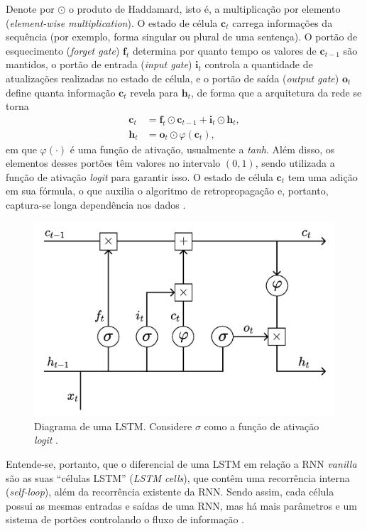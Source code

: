 \documentclass{automatextcc}
\newcommand{\bs}[1]{\boldsymbol{#1}}
\begin{document}
Denote por $\odot$ o produto de Haddamard, isto é, a multiplicação por elemento (\textit{element-wise multiplication}). O estado de célula $\bs{c}_t$ carrega informações da sequência (por exemplo, forma singular ou plural de uma sentença). O portão de esquecimento (\textit{forget gate}) $\bs{f}_t$ determina por quanto tempo os valores de $\bs{c}_{t-1}$ são mantidos, o portão de entrada (\textit{input gate}) $\bs{i}_t$ controla a quantidade de atualizações realizadas no estado de célula, e o portão de saída (\textit{output gate}) $\bs{o}_t$ define quanta informação $\bs{c}_t$ revela para $\bs{h}_t$, de forma que a arquitetura da rede se torna 
\begin{align*}
    \bs{c}_{t} & = \bs{f}_{t} \odot \bs{c}_{t-1} + \bs{i}_{t} \odot \bs{h}_{t}, \\
    \bs{h}_{t} & = \bs{o}_{t} \odot \varphi(\bs{c}_{t}),
\end{align*}
em que $\varphi(\cdot)$ é uma função de ativação, usualmente a \textit{tanh}. Além disso, os elementos desses portões têm valores no intervalo $(0,1)$, sendo utilizada a função de ativação \textit{logit} para garantir isso. O estado de célula $\bs{c}_t$ tem uma adição em sua fórmula, o que auxilia o algoritmo de retropropagação e, portanto, captura-se longa dependência nos dados \citep{goodfellow2016, fan2021}.

\begin{figure}[H]
    \centering
    \includegraphics[width=\textwidth]{figuras/lstm_cell.pdf}
	\caption{Diagrama de uma LSTM. Considere $\sigma$ como a função de ativação \textit{logit} \citep[adaptado de][]{kamath2019}.}
\end{figure}

Entende-se, portanto, que o diferencial de uma LSTM em relação a RNN \textit{vanilla} são as suas ``células LSTM'' (\textit{LSTM cells}), que contêm uma recorrência interna (\textit{self-loop}), além da recorrência existente da RNN. Sendo assim, cada célula possui as mesmas entradas e saídas de uma RNN, mas há mais parâmetros e um sistema de portões controlando o fluxo de informação \citep{goodfellow2016}.
\end{document}
